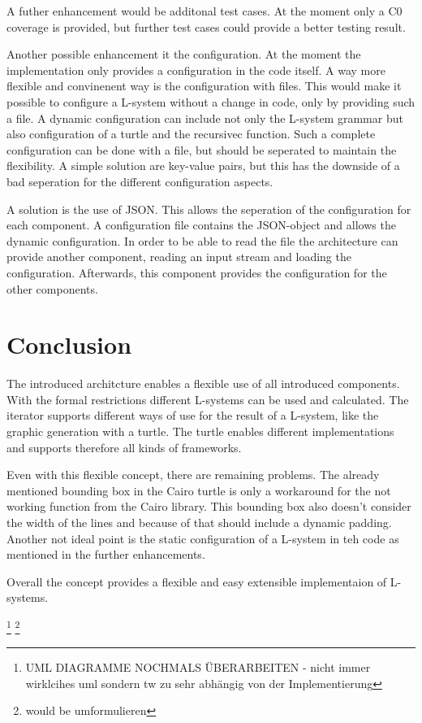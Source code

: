 \documentclass[english]{cpp-hmwk}
\begin{document}
\noindent A futher enhancement would be additonal test cases. At the moment only a C0 coverage is provided, but further test cases could provide a better testing result.

\noindent Another possible enhancement it the configuration. At the moment the implementation only provides a configuration in the code itself. A way more flexible and convinenent way is the configuration with files. This would make it possible to configure a L-system without a change in code, only by providing such a file. A dynamic configuration can include not only the L-system grammar but also configuration of a turtle and the recursivec function. Such a complete configuration can be done with a file, but should be seperated to maintain the flexibility. A simple solution are key-value pairs, but this has the downside of a bad seperation for the different configuration aspects.

A solution is the use of JSON. This allows the seperation of the configuration for each component. A configuration file contains the JSON-object and allows the dynamic configuration. In order to be able to read the file the architecture can provide another component, reading an input stream and loading the configuration. Afterwards, this component provides the configuration for the other components.

\section{Conclusion}
The introduced architcture enables a flexible use of all introduced components. With the formal restrictions different L-systems can be used and calculated. The iterator supports different ways of use for the result of a L-system, like the graphic generation with a turtle. The turtle enables different implementations and supports therefore all kinds of frameworks. 

\noindent Even with this flexible concept, there are remaining problems. The already mentioned bounding box in the Cairo turtle is only a workaround for the not working function from the Cairo library. This bounding box also doesn't consider the width of the lines and because of that should include a dynamic padding. Another not ideal point is the static configuration of a L-system in teh code as mentioned in the further enhancements. 

\noindent Overall the concept provides a flexible and easy extensible implementaion of L-systems.

\footnote{UML DIAGRAMME NOCHMALS ÜBERARBEITEN - nicht immer wirklcihes uml sondern tw zu sehr abhängig von der Implementierung}
\footnote{would be umformulieren}

\pagebreak
\printbibliography
\end{document}
